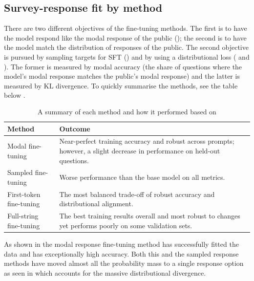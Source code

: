 \subsection{Survey-response fit by method}
\label{subsec:ft-results}

There are two different objectives of the fine-tuning methods. The first is to have the model respond like the modal response of the public (); the second is to have the model match the distribution of responses of the public. The second objective is pursued by sampling targets for SFT () and by using a distributional loss ( and ). The former is measured by modal accuracy (the share of questions where the model's modal response matches the public's modal response) and the latter is measured by KL divergence. To quickly summarise the methods, see the table below .

\begin{table}
  \centering
  \begin{tabular}{@{}l p{}@{}}
    \toprule
    Method & Outcome \\
    \midrule
    Modal fine-tuning & Near-perfect training accuracy and robust across prompts; however, a slight decrease in performance on held-out questions. \\
    Sampled fine-tuning & Worse performance than the base model on all metrics. \\
    First-token fine-tuning & The most balanced trade-off of robust accuracy and distributional alignment. \\
    Full-string fine-tuning & The best training results overall and most robust to changes yet performs poorly on some validation sets. \\
    \bottomrule
  \end{tabular}
  \caption{A summary of each method and how it performed based on }
  \label{tab:ft-results}
\end{table}


As shown in  the modal response fine-tuning method has successfully fitted the data and has exceptionally high accuracy. Both this and the sampled response methods have moved almost all the probability mass to a single response option as seen in  which accounts for the massive distributional divergence.


